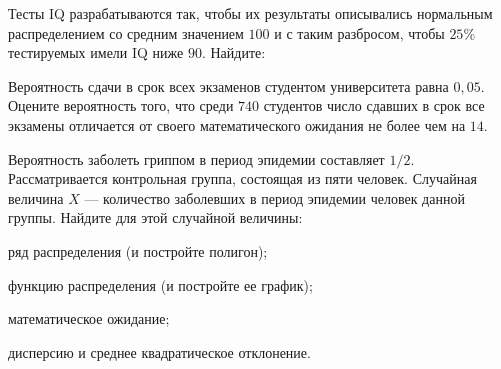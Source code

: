 \vfil

\begin{zkrPlain}{25}\noindent 
	Тесты IQ разрабатываются так, чтобы их результаты описывались нормальным распределением со средним значением $100$ и с таким разбросом, чтобы $25\%$ тестируемых имели IQ ниже $90$. Найдите: \par {}
 
\end{zkrPlain}

\vfil

\begin{zkrPlain}{25}\noindent 
	Вероятность сдачи в срок всех экзаменов студентом университета равна $ 0{,}05 $. Оцените вероятность того, что среди $ 740 $ студентов число сдавших в срок все экзамены отличается от своего математического ожидания не более чем на $ 14 $. 
 
\end{zkrPlain}

\newpage\setcounter{zad}{0}\setcounter{footnote}{0}



\begin{zkrPlain}{25}\noindent 
		Вероятность заболеть гриппом в период эпидемии составляет $1/2$. Рассматривается контрольная группа, состоящая из пяти человек. Случайная величина $X$ --- количество заболевших в период эпидемии человек данной группы.  Найдите для этой случайной величины: \par \smallskip\small{ \par \zz ряд распределения (и постройте полигон); \par \zz функцию распределения (и постройте ее график); \par \zz математическое ожидание; \par \zz дисперсию и среднее квадратическое отклонение.\par \par}
 
\end{zkrPlain}

\vfil

